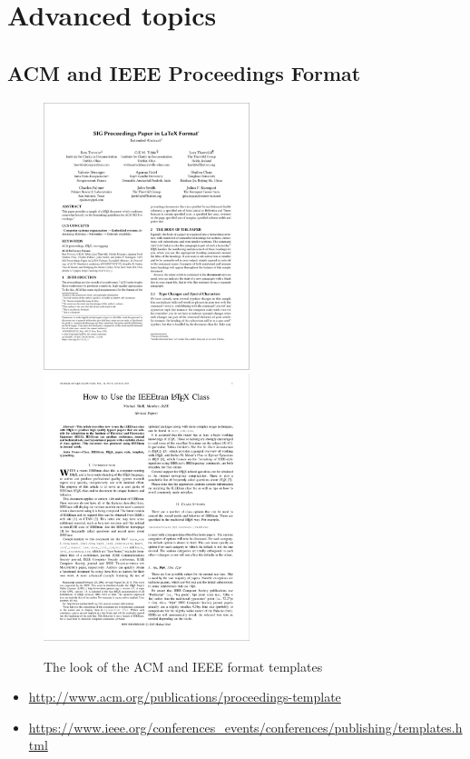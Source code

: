 \section{Advanced topics}

\subsection{ACM and IEEE Proceedings Format}\label{acm-proceedings-format}

\begin{figure}[!h]
  \includegraphics[width=6cm]{images/doc/acm.png}
  \hfill
  \includegraphics[width=6cm]{images/doc/ieee.png}
\caption{The look of the ACM and IEEE format templates}
\end{figure}

\begin{itemize}

\item
  \url{http://www.acm.org/publications/proceedings-template}
\item
  \url{https://www.ieee.org/conferences_events/conferences/publishing/templates.html}
\end{itemize}

